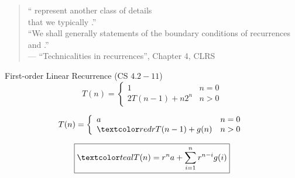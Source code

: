 
\begin{frame}{}

  \vspace{0.30cm}
  \centerline{}

  \pause
  \vspace{0.30cm}
  \begin{quote}
    \centering
    `` represent another class of details \\
    that we typically .''  \\[6pt]

    ``We shall generally  statements of the boundary conditions of recurrences 
    and .'' \\[6pt]

    \hfill --- ``Technicalities in recurrences'', Chapter 4, CLRS
  \end{quote}

  \pause
  \vspace{0.30cm}
  \centerline{}
\end{frame}

\begin{frame}{}
  \begin{exampleblock}{First-order Linear Recurrence (CS $4.2-11$)}
    \[
      T(n) = \left\{\begin{array}{lr}
	1		& n = 0 \\
	2T(n-1) + n 2^n & n > 0 
      \end{array}\right.
    \]
  \end{exampleblock}

  \pause
  \vspace{0.50cm}
  \begin{theorem}
    \[
      T(n) = \left\{\begin{array}{lr}
	a		& n = 0 \\
	\red{r}T(n-1) + g(n) & n > 0 
      \end{array}\right.
    \]

    \pause
    \vspace{0.30cm}
    \[
      \boxed{\teal{T(n) = r^n a + \sum_{i=1}^{n} r^{n-i} g(i)}}
    \]
  \end{theorem}
\end{frame}

